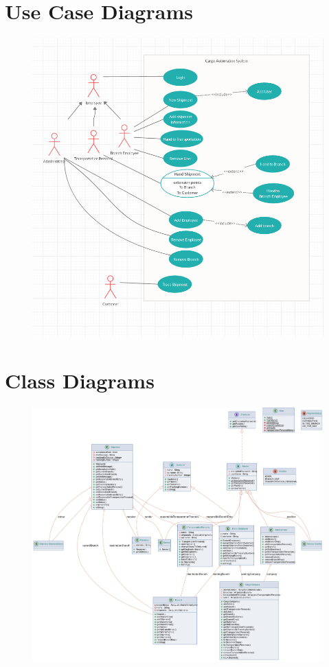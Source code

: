 \documentclass[a4paper]{article}
\begin{document}
\begin{Large}
\newpage

\section{Use Case Diagrams}

\begin{figure}[htp]
	\centering
	\includegraphics[width=\textwidth]{use-case}
\end{figure}

\newpage

\section{Class Diagrams}

\begin{figure}[htp]
	\centering
	\includegraphics[width=\textwidth]{class-diagram}
\end{figure}


\end{Large}
\end{document}
